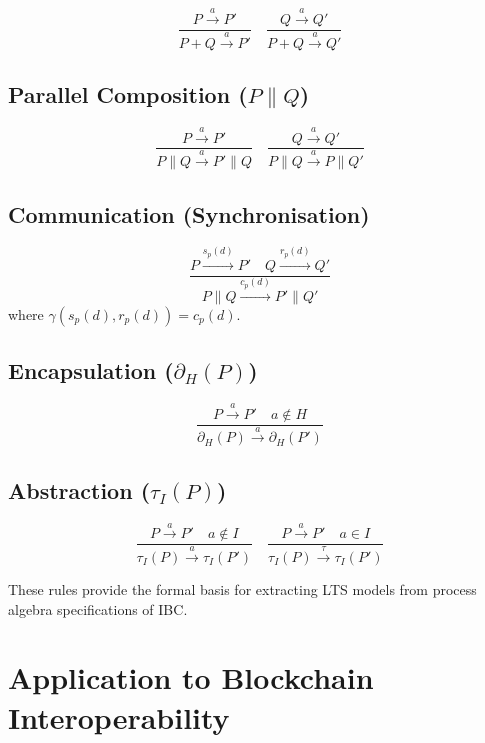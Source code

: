 \[
\frac{P \xrightarrow{a} P'}{P + Q \xrightarrow{a} P'} \quad
\frac{Q \xrightarrow{a} Q'}{P + Q \xrightarrow{a} Q'}
\]

\subsection{\texorpdfstring{Parallel Composition
(\(P \parallel Q\))}{Parallel Composition (P \textbackslash parallel Q)}}\label{parallel-composition-p-parallel-q}

\[
\frac{P \xrightarrow{a} P'}{P \parallel Q \xrightarrow{a} P' \parallel Q} \quad
\frac{Q \xrightarrow{a} Q'}{P \parallel Q \xrightarrow{a} P \parallel Q'}
\]

\subsection{Communication
(Synchronisation)}\label{communication-synchronisation}

\[
\frac{P \xrightarrow{s_p(d)} P' \quad Q \xrightarrow{r_p(d)} Q'}{P \parallel Q \xrightarrow{c_p(d)} P' \parallel Q'}
\] where \(\gamma(s_p(d), r_p(d)) = c_p(d)\).

\subsection{\texorpdfstring{Encapsulation
(\(\partial_H(P)\))}{Encapsulation (\textbackslash partial\_H(P))}}\label{encapsulation-partial_hp}

\[
\frac{P \xrightarrow{a} P' \quad a \notin H}{\partial_H(P) \xrightarrow{a} \partial_H(P')}
\]

\subsection{\texorpdfstring{Abstraction
(\(\tau_I(P)\))}{Abstraction (\textbackslash tau\_I(P))}}\label{abstraction-tau_ip}

\[
\frac{P \xrightarrow{a} P' \quad a \notin I}{\tau_I(P) \xrightarrow{a} \tau_I(P')} \quad
\frac{P \xrightarrow{a} P' \quad a \in I}{\tau_I(P) \xrightarrow{\tau} \tau_I(P')}
\]

These rules provide the formal basis for extracting LTS models from
process algebra specifications of IBC.

\section{Application to Blockchain
Interoperability}\label{application-to-blockchain-interoperability}

